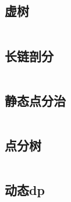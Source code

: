 \documentclass[twoside]{article}
\begin{document}
\subsection{虚树}
\begin{lstlisting}

\end{lstlisting}
\subsection{长链剖分}
\begin{lstlisting}

\end{lstlisting}
\subsection{静态点分治}
\begin{lstlisting}

\end{lstlisting}
\subsection{点分树}
\begin{lstlisting}

\end{lstlisting}
\subsection{动态dp}
\begin{lstlisting}

\end{lstlisting}
\end{document}
